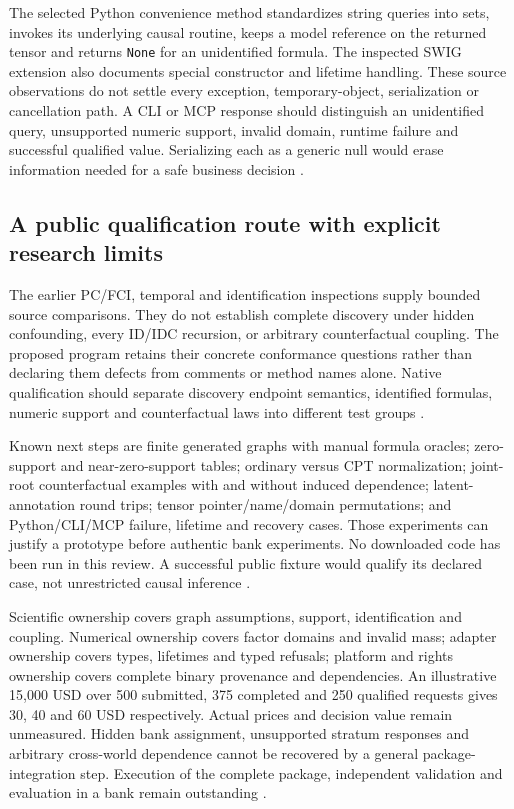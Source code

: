 The selected Python convenience method standardizes string queries into
sets, invokes its underlying causal routine, keeps a model reference on the
returned tensor and returns \texttt{None} for an unidentified formula.
The inspected SWIG extension also documents special constructor and lifetime
handling. These source observations do not settle every exception,
temporary-object, serialization or cancellation path. A CLI or MCP response
should distinguish an unidentified query, unsupported numeric support,
invalid domain, runtime failure and successful qualified value. Serializing
each as a generic null would erase information needed for a safe business
decision \citep{exec24_agrum_source,exec24_agrum_choice}.

\subsection{A public qualification route with explicit research limits}
The earlier PC/FCI, temporal and identification inspections supply bounded
source comparisons. They do not establish complete discovery under hidden
confounding, every ID/IDC recursion, or arbitrary counterfactual coupling.
The proposed program retains their concrete conformance questions rather
than declaring them defects from comments or method names alone. Native
qualification should separate discovery endpoint semantics, identified
formulas, numeric support and counterfactual laws into different test groups
\citep{exec13_cxx_agrum,exec14_native_agrum,exec16_ct_agrum,
exec19_cxx_identification_source,exec24_agrum_choice}.

Known next steps are finite generated graphs with manual formula oracles;
zero-support and near-zero-support tables; ordinary versus CPT normalization;
joint-root counterfactual examples with and without induced dependence;
latent-annotation round trips; tensor pointer/name/domain permutations;
and Python/CLI/MCP failure, lifetime and recovery cases. Those experiments
can justify a prototype before authentic bank experiments. No downloaded
code has been run in this review. A successful public fixture would qualify
its declared case, not unrestricted causal inference
\citep{exec24_agrum_choice}.

Scientific ownership covers graph assumptions, support, identification and
coupling. Numerical ownership covers factor domains and invalid mass;
adapter ownership covers types, lifetimes and typed refusals; platform and
rights ownership covers complete binary provenance and dependencies.
An illustrative 15,000 USD over 500 submitted, 375 completed and 250
qualified requests gives 30, 40 and 60 USD respectively. Actual prices and
decision value remain unmeasured. Hidden bank assignment, unsupported
stratum responses and arbitrary cross-world dependence cannot be recovered
by a general package-integration step. Execution of the complete package, independent validation and evaluation in a bank remain outstanding \citep{exec24_agrum_choice}.

